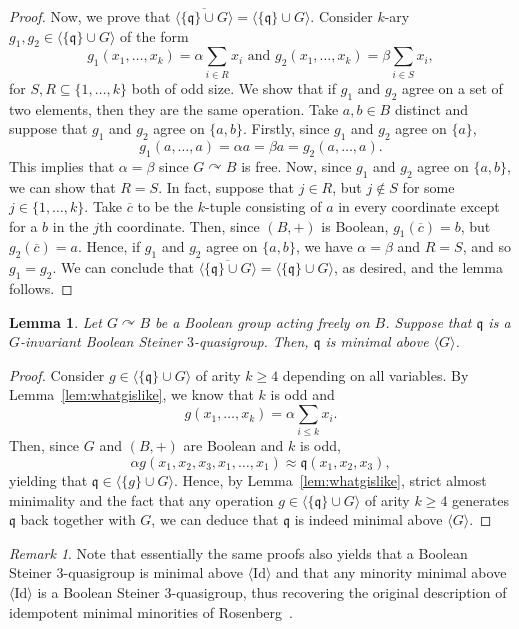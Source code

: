 \documentclass{article}
\newtheorem{lemma}[theorem]{Lemma}
\theoremstyle{remark}
\newtheorem{remark}[theorem]{Remark}
\theoremstyle{definition}
\def\acts{\curvearrowright}
\begin{document}
\begin{proof}
Now, we prove that $\overline{\langle\{\mathfrak{q}\}\cup G\rangle}=\langle\{\mathfrak{q}\}\cup G\rangle$. Consider $k$-ary $g_1, g_2\in\langle\{\mathfrak{q}\}\cup G\rangle$ of the form
\[g_1(x_1, \dots, x_k)=\alpha \sum_{i\in R} x_i \text{ and } g_2(x_1, \dots, x_k)=\beta \sum_{i\in S} x_i,\]
for $S, R\subseteq \{1, \dots, k\}$ both of odd size. We show that if $g_1$ and $g_2$ agree on a set of two elements, then they are the same operation. Take $a,b\in B$ distinct and suppose that $g_1$ and $g_2$ agree on $\{a,b\}$. Firstly, since $g_1$ and $g_2$ agree on $\{a\}$, 
\[g_1(a, \dots, a)=\alpha a=\beta a=g_2(a, \dots, a).\]
This implies that $\alpha=\beta$ since $G\acts B$ is free. Now, since $g_1$ and $g_2$ agree on $\{a,b\}$, we can show that $R=S$. In fact, suppose that $j\in R$, but $j\not\in S$ for some $j\in \{1, \dots, k\}$. Take $\overline{c}$ to be the $k$-tuple consisting of $a$ in every coordinate except for a $b$ in the $j$th coordinate. Then, since $(B, +)$ is Boolean, $g_1(\overline{c})=b$, but $g_2(\overline{c})=a$. Hence, if $g_1$ and $g_2$ agree on $\{a,b\}$, we have $\alpha=\beta$ and $R=S$, and so $g_1=g_2$. We can conclude that $\overline{\langle\{\mathfrak{q}\}\cup G\rangle}=\langle\{\mathfrak{q}\}\cup G\rangle$, as desired, and the lemma follows. 
\end{proof}



\begin{lemma}\label{lem:boolmin} Let $G\acts B$ be a Boolean group acting freely on $B$. Suppose that $\mathfrak{q}$ is a $G$-invariant Boolean Steiner $3$-quasigroup. Then, $\mathfrak{q}$ is minimal above $\langle G \rangle$.
\end{lemma}
\begin{proof} Consider $g\in\langle\{\mathfrak{q}\}\cup G\rangle$ of arity $k\geq 4$ depending on all variables. By Lemma~\ref{lem:whatgislike}, we know that $k$ is odd and
\[g(x_1, \dots, x_k)=\alpha \sum_{i\leq k} x_i.\]
Then, since $G$ and $(B, +)$ are Boolean and $k$ is odd,
\[\alpha g(x_1, x_2, x_3, x_1, \dots, x_1)\approx \mathfrak{q}(x_1, x_2, x_3),\]
yielding that $\mathfrak{q}\in \langle \{g\} \cup G \rangle$. Hence, by Lemma~\ref{lem:whatgislike}, strict almost minimality and the fact that any operation  $g\in\langle\{\mathfrak{q}\}\cup G\rangle$ of arity $k\geq 4$ generates $\mathfrak{q}$ back together with $G$, we can deduce that $\mathfrak{q}$ is indeed minimal above $\langle G \rangle$.
\end{proof}

\begin{remark} Note that essentially the same proofs also yields that a Boolean Steiner $3$-quasigroup is minimal above $\langle \mathrm{Id} \rangle$ and that any minority minimal above $\langle \mathrm{Id} \rangle$ is a Boolean Steiner $3$-quasigroup, thus recovering the original description of idempotent minimal minorities of Rosenberg~\cite{fivetypes}. 
\end{remark}
\end{document}
